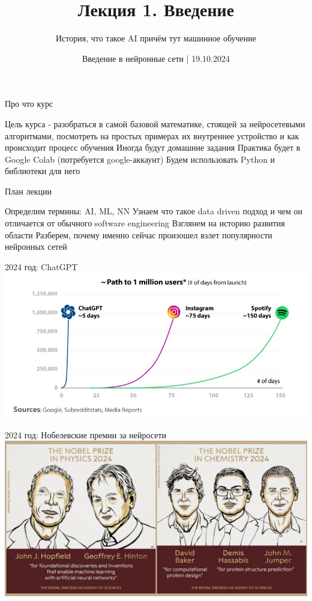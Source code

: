 \documentclass[aspectratio=169, professionalfonts]{beamer}
\title{Лекция 1. Введение}
\subtitle{История, что такое AI причём тут машинное обучение}
\date{Введение в нейронные сети | 19.10.2024}
\begin{document}
\maketitle


\begin{frame}{Про что курс}
    \begin{outline}
        \1 Цель курса - разобраться в самой базовой математике, стоящей за нейросетевыми алгоритмами, посмотреть на простых примерах их внутреннее устройство и как происходит процесс обучения
        \1 Иногда будут домашние задания
        \1 Практика будет в Google Colab (потребуется google-аккаунт)
        \1 Будем использовать Python и библиотеки для него
    \end{outline}
\end{frame}

\begin{frame}{План лекции}
    \begin{outline}
        \1 Определим термины: AI, ML, NN
        \1 Узнаем что такое data driven подход и чем он отличается от обычного
        software engineering
        \1 Взглянем на историю развития области
        \1 Разберем, почему именно сейчас произошел взлет популярности нейронных сетей
    \end{outline}
\end{frame}

\begin{frame}{2024 год: ChatGPT}
    \centering
    \includegraphics[width=.8\linewidth]{figures/fig0-chatgpt-growth.jpg}
\end{frame}

\begin{frame}{2024 год: Нобелевские премии за нейросети}
    \centering
    \includegraphics[width=.85\linewidth]{figures/fig1-2024-nobel-prize.jpg}
\end{frame}
\end{document}
